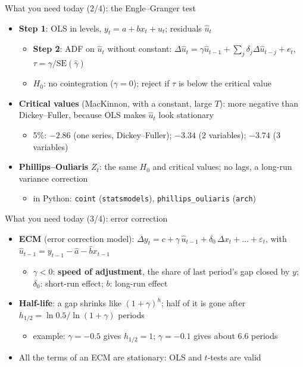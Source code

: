 \begin{frame}{What you need today (2/4): the Engle--Granger test}
\itemsize{\small}
\begin{itemize}
    \item \textbf{Step 1}: OLS in levels, $y_t = a + b x_t + u_t$; residuals $\hat u_t$
    \begin{itemize}
        \item \textbf{Step 2}: ADF on $\hat u_t$ without constant: $\Delta\hat u_t = \gamma\hat u_{t-1} + \sum_j\delta_j\Delta\hat u_{t-j} + e_t$, $\tau = \hat\gamma/\mathrm{SE}(\hat\gamma)$
        \item $H_0$: no cointegration ($\gamma = 0$); reject if $\tau$ is below the critical value
    \end{itemize}
    \item \textbf{Critical values} (MacKinnon, with a constant, large $T$): more negative than Dickey--Fuller, because OLS makes $\hat u_t$ look stationary
    \begin{itemize}
        \item 5\%: $-2.86$ (one series, Dickey--Fuller); $-3.34$ (2 variables); $-3.74$ (3 variables)
    \end{itemize}
    \item \textbf{Phillips--Ouliaris} $Z_t$: the same $H_0$ and critical values; no lags, a long-run variance correction
    \begin{itemize}
        \item in Python: \texttt{coint} (\texttt{statsmodels}), \texttt{phillips\_ouliaris} (\texttt{arch})
    \end{itemize}
\end{itemize}
\end{frame}

\begin{frame}{What you need today (3/4): error correction}
\itemsize{\small}
\begin{itemize}
    \item \textbf{ECM} (error correction model): $\Delta y_t = c + \gamma\,\hat u_{t-1} + \delta_0\,\Delta x_t + \dots + \varepsilon_t$, with $\hat u_{t-1} = y_{t-1} - \hat a - \hat b x_{t-1}$
    \begin{itemize}
        \item $\gamma < 0$: \textbf{speed of adjustment}, the share of last period's gap closed by $y$; $\delta_0$: short-run effect; $b$: long-run effect
    \end{itemize}
    \item \textbf{Half-life}: a gap shrinks like $(1 + \gamma)^h$; half of it is gone after $h_{1/2} = \ln 0.5/\ln(1 + \gamma)$ periods
    \begin{itemize}
        \item example: $\gamma = -0.5$ gives $h_{1/2} = 1$; $\gamma = -0.1$ gives about 6.6 periods
    \end{itemize}
    \item All the terms of an ECM are stationary: OLS and $t$-tests are valid
\end{itemize}
\end{frame}

